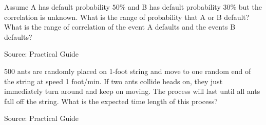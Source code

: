 \begin{exe}
Assume A has default probability $50\%$ and B has default probability $30\%$ but the correlation is unknown. What is the range of probability that A or B default? What is the range of correlation of the event A defaults and the events B defaults?
\end{exe}
Source: Practical Guide
\begin{teacher}
\begin{sol}
\end{sol}
\end{teacher}

\begin{exe}
500 ants are randomly placed on 1-foot string and move to one random end of the string at speed 1 foot/min. If two ants collide heads on, they just immediately turn around and keep on moving. The process will last until all ants fall off the string. What is the expected time length of this process?
\end{exe}
Source: Practical Guide
\begin{teacher}
\begin{sol}
\end{sol}
\end{teacher}

\begin{exe}

\end{exe}
\begin{teacher}
\begin{sol}
\end{sol}
\end{teacher}

\begin{exe}

\end{exe}
\begin{teacher}
\begin{sol}
\end{sol}
\end{teacher}

\begin{exe}

\end{exe}
\begin{teacher}
\begin{sol}
\end{sol}
\end{teacher}

\begin{exe}

\end{exe}
\begin{teacher}
\begin{sol}
\end{sol}
\end{teacher}

